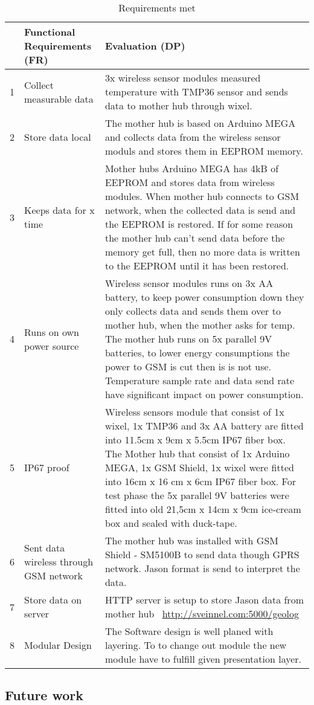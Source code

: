  \begin{table}[H]
 	\caption{Requirements met}
 	\begin{tabular}{|l|p{4cm}| p{11.2cm} |}
 		
 		\hline
 		& \textbf{Functional Requirements (FR)}  & \textbf{Evaluation (DP)} \\  
 		\hline 1 &  Collect measurable data & 3x wireless sensor modules measured temperature with  TMP36 \cite{Devices2010} sensor and sends data to mother hub through wixel. \\ 
 		           		
 		\hline 2 & Store data local &   The mother hub is based on Arduino MEGA and collects data from the wireless sensor moduls and stores them in EEPROM memory. \\
 	
 		\hline 3 & Keeps data for x time &  Mother hubs Arduino MEGA \cite{arduinoMega} has 4kB of EEPROM and stores  data from wireless modules. When mother hub connects to GSM network, when the collected data is send and the EEPROM is restored. If for some reason the mother hub can't send data before the memory get full, then no more data is written to the EEPROM until it has been restored.  \\
 	
 		\hline 4 & Runs on own power source & Wireless sensor modules runs on 3x AA battery, to keep power consumption down they only collects data and sends them over to mother hub, when the mother asks for temp. The mother hub runs on 5x parallel 9V batteries, to lower energy consumptions the power to GSM is cut then is is not use. Temperature sample rate and data send rate have significant impact on power consumption. \\ 
 	
 		\hline 5 & IP67 proof &   Wireless sensors module that consist of 1x wixel, 1x TMP36 and 3x AA battery are fitted into 11.5cm x 9cm x 5.5cm IP67 fiber box. The Mother hub that consist of 1x Arduino MEGA, 1x GSM Shield, 1x wixel were fitted into 16cm x 16 cm x 6cm IP67 fiber box. For test phase the 5x parallel 9V batteries were fitted into old 21,5cm x 14cm x 9cm ice-cream box and sealed with duck-tape. \\
 	
 		\hline 6 & Sent data wireless through GSM network & The mother hub was installed with GSM Shield - SM5100B \cite{Sparkfun2014} to send data though GPRS network. Jason format is send to interpret the data. \\ 
 	
 		\hline 7 & Store data on server & HTTP server is setup to store Jason data from mother hub ~\url{http://sveinnel.com:5000/geolog} \\ 
 	
 		\hline 8 & Modular Design & The Software design is well planed with layering. To to change out module the new module have to fulfill given presentation layer.  \\
 		\hline
 	\end{tabular}
 \end{table}

\subsection*{Future work}

